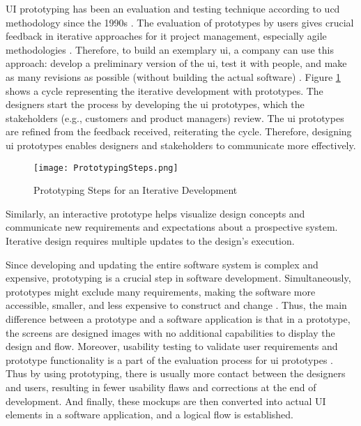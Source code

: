 UI prototyping has been an evaluation and testing technique according to \ac{ucd} methodology since the 1990s \cite{article:prototyping:preece}.
The evaluation of prototypes by users gives crucial feedback in iterative approaches for \ac{it} project management, especially agile methodologies \cite{article:prototyping:schwaber}.
Therefore, to build an exemplary \ac{ui}, a company can use this approach: develop a preliminary version of the \ac{ui}, test it with people, and make as many revisions as possible (without building the actual software) \cite{article:prototyping:gould}.
Figure \ref{fig:background:stepsPrototyping} shows a cycle representing the iterative development with prototypes.
The designers start the process by developing the \ac{ui} prototypes, which the stakeholders (e.g., customers and product managers) review. 
The \ac{ui} prototypes are refined from the feedback received, reiterating the cycle.
Therefore, designing \ac{ui} prototypes enables designers and stakeholders to communicate more effectively.
\begin{figure}[htbp!]
  \centering    
  \texttt{[image: PrototypingSteps.png]}
  \caption[Steps of Prototyping]{Prototyping Steps for an Iterative Development}
  \label{fig:background:stepsPrototyping}
\end{figure}
Similarly, an interactive prototype helps visualize design concepts and communicate new requirements and expectations about a prospective system.
Iterative design requires multiple updates to the design's execution.

Since developing and updating the entire software system is complex and expensive, prototyping is a crucial step \cite{article:prototyping:szekely} in software development.
Simultaneously, prototypes might exclude many requirements, making the software more accessible, smaller, and less expensive to construct and change \cite{article:prototyping:szekely}. 
Thus, the main difference between a prototype and a software application is that in a prototype, the screens are designed images with no additional capabilities to display the design and flow. 
Moreover, usability testing to validate user requirements and prototype functionality is a part of the evaluation process for \ac{ui} prototypes \cite{article:prototyping:hoffnagle}.
Thus by using prototyping, there is usually more contact between the designers and users, resulting in fewer usability flaws and corrections at the end of development.
And finally, these mockups are then converted into actual UI elements in a software application, and a logical flow is established.

